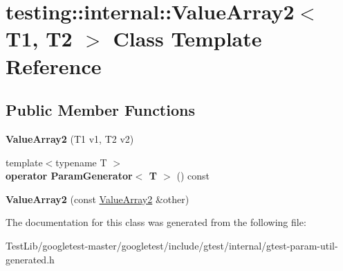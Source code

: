 \hypertarget{classtesting_1_1internal_1_1ValueArray2}{}\section{testing\+:\+:internal\+:\+:Value\+Array2$<$ T1, T2 $>$ Class Template Reference}
\label{classtesting_1_1internal_1_1ValueArray2}
\subsection*{Public Member Functions}
\begin{DoxyCompactItemize}
\item 
\mbox{\label{classtesting_1_1internal_1_1ValueArray2_af641714b9a06929e4dcabe8854d0da1c}} 
{\bfseries Value\+Array2} (T1 v1, T2 v2)
\item 
\mbox{\label{classtesting_1_1internal_1_1ValueArray2_aa81899f10bfd345c17aae540acc296a9}} 
{\footnotesize template$<$typename T $>$ }\\{\bfseries operator Param\+Generator$<$ T $>$} () const
\item 
\mbox{\label{classtesting_1_1internal_1_1ValueArray2_ac0da580bf4f38494da741c7140a7927d}} 
{\bfseries Value\+Array2} (const \hyperlink{classtesting_1_1internal_1_1ValueArray2}{Value\+Array2} \&other)
\end{DoxyCompactItemize}


The documentation for this class was generated from the following file\+:\begin{DoxyCompactItemize}
\item 
Test\+Lib/googletest-\/master/googletest/include/gtest/internal/gtest-\/param-\/util-\/generated.\+h\end{DoxyCompactItemize}
